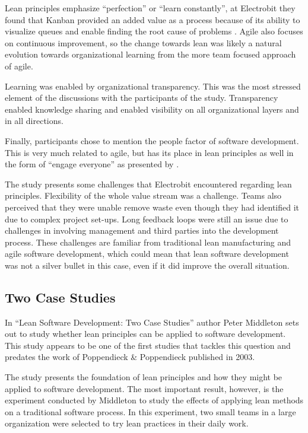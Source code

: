 Lean principles emphasize ``perfection'' or ``learn constantly'', at Electrobit they found that Kanban provided an added value as a process because of its ability to visualize queues and enable finding the root cause of problems \cite{Rodriguez2014Combining}. Agile also focuses on continuous improvement, so the change towards lean was  likely a natural evolution towards organizational learning from the more team focused approach of agile.

Learning was enabled by organizational transparency. This was the most stressed element of the discussions with the participants of the study. Transparency enabled knowledge sharing and enabled visibility on all organizational layers and in all directions. \cite{Rodriguez2014Combining}

Finally, participants chose to mention the people factor of software development. This is very much related to agile, but has its place in lean principles as well in the form of ``engage everyone'' as presented by \cite{poppendieck2003lean}.

The study presents some challenges that Electrobit encountered regarding lean principles. Flexibility of the whole value stream was a challenge. Teams also perceived that they were unable remove waste even though they had identified it due to complex project set-ups. Long feedback loops were still an issue due to challenges in involving management and third parties into the development process. \cite{Rodriguez2014Combining} These challenges are familiar from traditional lean manufacturing and agile software development, which could mean that lean software development was not a silver bullet in this case, even if it did improve the overall situation.


\subsection{Two Case Studies}
\label{twocasestudies}

In ``Lean Software Development: Two Case Studies''\cite{Middleton2001Lean} author Peter Middleton sets out to study whether lean principles can be applied to software development. This study appears to be one of the first studies that tackles this question and predates the work of Poppendieck \& Poppendieck published in 2003.

The study presents the foundation of lean principles and how they might be applied to software development. The most important result, however, is the experiment conducted by Middleton to study the effects of applying lean methods on a traditional software process. In this experiment, two small teams in a large organization were selected to try lean practices in their daily work.\cite{Middleton2001Lean}

